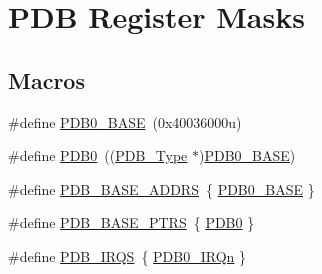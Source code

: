 \hypertarget{group___p_d_b___register___masks}{}\section{P\+DB Register Masks}
\label{group___p_d_b___register___masks}
\subsection*{Macros}
\begin{DoxyCompactItemize}
\item 
\#define \mbox{\hyperlink{group___p_d_b___register___masks_gaca699dde276786b0443ef728ae1f01c0}{P\+D\+B0\+\_\+\+B\+A\+SE}}~(0x40036000u)
\item 
\#define \mbox{\hyperlink{group___p_d_b___register___masks_ga91cdd5c74efea207fd5cf60bb271b90c}{P\+D\+B0}}~((\mbox{\hyperlink{struct_p_d_b___type}{P\+D\+B\+\_\+\+Type}} $\ast$)\mbox{\hyperlink{group___p_d_b___register___masks_gaca699dde276786b0443ef728ae1f01c0}{P\+D\+B0\+\_\+\+B\+A\+SE}})
\item 
\#define \mbox{\hyperlink{group___p_d_b___register___masks_ga2aac97276b35cabb3a49413841a8bbe2}{P\+D\+B\+\_\+\+B\+A\+S\+E\+\_\+\+A\+D\+D\+RS}}~\{ \mbox{\hyperlink{group___p_d_b___register___masks_gaca699dde276786b0443ef728ae1f01c0}{P\+D\+B0\+\_\+\+B\+A\+SE}} \}
\item 
\#define \mbox{\hyperlink{group___p_d_b___register___masks_ga6dce940c99da63282b1d28f65ed75293}{P\+D\+B\+\_\+\+B\+A\+S\+E\+\_\+\+P\+T\+RS}}~\{ \mbox{\hyperlink{group___p_d_b___register___masks_ga91cdd5c74efea207fd5cf60bb271b90c}{P\+D\+B0}} \}
\item 
\#define \mbox{\hyperlink{group___p_d_b___register___masks_ga8e897cb723b12765718d641d60409ce3}{P\+D\+B\+\_\+\+I\+R\+QS}}~\{ \mbox{\hyperlink{group___interrupt__vector__numbers_gga666eb0caeb12ec0e281415592ae89083a88267c4e978fd991b88267fccba49c70}{P\+D\+B0\+\_\+\+I\+R\+Qn}} \}
\end{DoxyCompactItemize}
